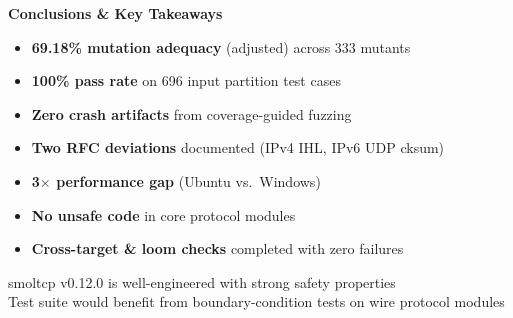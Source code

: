 \documentclass[aspectratio=169,11pt]{beamer}
\begin{document}
{
\begin{frame}[plain]
  \vspace{0.8cm}
  \centering
  {\Large\bfseries\color{white} Conclusions \& Key Takeaways\par}
  \vspace{0.4cm}
  \color{accentlime}
  \begin{itemize}
    \item[\textcolor{lightgreen}{$\checkmark$}] \color{white}\textbf{69.18\% mutation adequacy} (adjusted) across 333 mutants
    \item[\textcolor{lightgreen}{$\checkmark$}] \color{white}\textbf{100\% pass rate} on 696 input partition test cases
    \item[\textcolor{lightgreen}{$\checkmark$}] \color{white}\textbf{Zero crash artifacts} from coverage-guided fuzzing
    \item[\textcolor{lightgreen}{$\checkmark$}] \color{white}\textbf{Two RFC deviations} documented (IPv4 IHL, IPv6 UDP cksum)
    \item[\textcolor{lightgreen}{$\checkmark$}] \color{white}\textbf{3$\times$ performance gap} (Ubuntu vs.\ Windows)
    \item[\textcolor{lightgreen}{$\checkmark$}] \color{white}\textbf{No unsafe code} in core protocol modules
    \item[\textcolor{lightgreen}{$\checkmark$}] \color{white}\textbf{Cross-target \& loom checks} completed with zero failures
  \end{itemize}
  \vspace{0.5cm}
  {\color{white!80}\small smoltcp v0.12.0 is well-engineered with strong safety properties\\
  Test suite would benefit from boundary-condition tests on wire protocol modules}
\end{frame}
}
\end{document}
